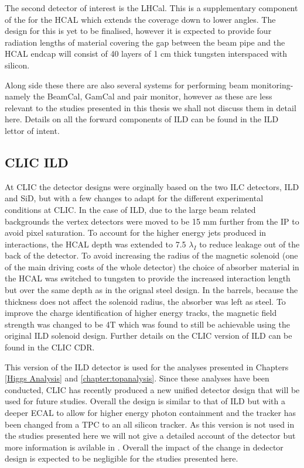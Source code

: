 The second detector of interest is the LHCal. This is a supplementary component of the for the \ac{HCAL} which extends the coverage down to lower angles. The design for this is yet to be finalised, however it is expected to provide four radiation lengths of material covering the gap between the beam pipe and the \ac{HCAL} endcap will consist of 40 layers of 1 cm thick tungsten interspaced with silicon.

Along side these there are also several systems for performing beam monitoring- namely the BeamCal, GamCal and pair monitor, however as these are less relevant to the studies presented in this thesis we shall not discuss them in detail here. Details on all the forward components of \ac{ILD} can be found in the \ac{ILD} lettor of intent\cite{ILD}.


\subsection{CLIC ILD}

At \ac{CLIC} the detector designs were orginally based on the two \ac{ILC} detectors, \ac{ILD} and \ac{SiD}, but with a few changes to adapt for the different experimental conditions at \ac{CLIC}. In the case of \ac{ILD}, due to the large beam related backgrounds the vertex detectors were moved to be 15 mm further from the \ac{IP} to avoid pixel saturation. To account for the higher energy jets produced in interactions, the \ac{HCAL} depth was extended to 7.5 $\lambda_I$ to reduce leakage out of the back of the detector. To avoid increasing the radius of the magnetic solenoid (one of the main driving costs of the whole detector) the choice of absorber material in the \ac{HCAL} was switched to tungsten to provide the increased interaction length but over the same depth as in the orignal steel design. In the barrels, because the thickness does not affect the solenoid radius, the absorber was left as steel. To improve the charge identification of higher energy tracks, the magnetic field strength was changed to be 4T which was found to still be achievable using the original \ac{ILD} solenoid design. Further details on the CLIC version of \ac{ILD} can be found in the \ac{CLIC} \ac{CDR}\cite{CDR}.

This version of the \ac{ILD} detector is used for the analyses presented in Chapters \ref{Higgs Analysis} and \ref{chapter:topanalysis}. Since these analyses have been conducted, \ac{CLIC} has recently produced a new unified detector design that will be used for future studies. Overall the design is similar to that of \ac{ILD} but with a deeper \ac{ECAL} to allow for higher energy photon containment and the tracker has been changed from a \ac{TPC} to an all silicon tracker. As this version is not used in the studies presented here we will not give a detailed account of the detector but more information is avilable in \cite{Pitters:2018jxt}. Overall the impact of the change in dedector design is expected to be negligible for the studies presented here.






